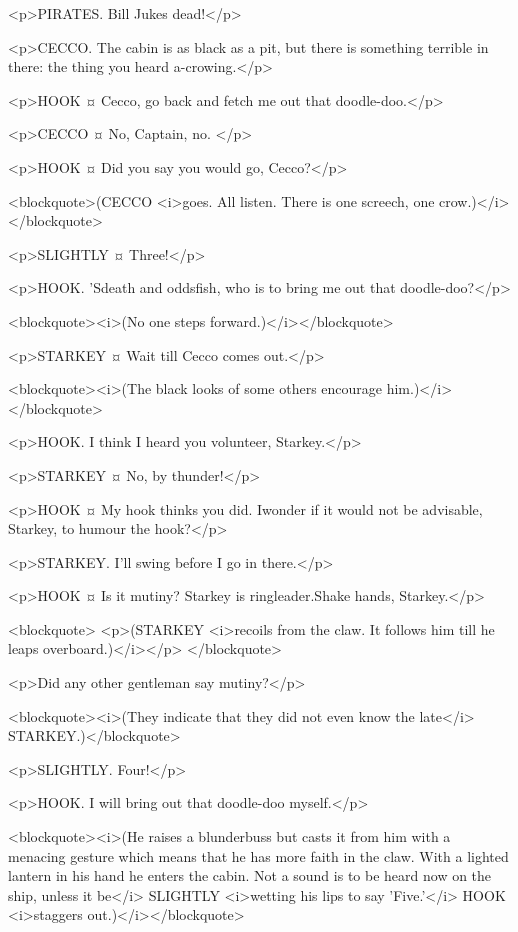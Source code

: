 <p>PIRATES. Bill Jukes dead!</p>

<p>CECCO. The cabin is as black as a pit, but there is something terrible in there: the thing you heard a-crowing.</p>

<p>HOOK ¤
Cecco, go back and fetch me out that doodle-doo.</p>

<p>CECCO ¤
No, Captain, no.
</p>

<p>HOOK ¤
Did you say you would go, Cecco?</p>

<blockquote>(CECCO <i>goes. All listen. There is one screech, one crow.)</i></blockquote>

<p>SLIGHTLY ¤
Three!</p>

<p>HOOK. 'Sdeath and oddsfish, who is to bring me out that doodle-doo?</p>

<blockquote><i>(No one steps forward.)</i></blockquote>

<p>STARKEY ¤
Wait till Cecco comes out.</p>

<blockquote><i>(The black looks of some others encourage him.)</i></blockquote>

<p>HOOK. I think I heard you volunteer, Starkey.</p>

<p>STARKEY ¤
No, by thunder!</p>

<p>HOOK ¤
My hook thinks you did. Iwonder if it would not be advisable, Starkey, to humour the hook?</p>

<p>STARKEY. I'll swing before I go in there.</p>

<p>HOOK ¤
Is it mutiny? Starkey is ringleader.Shake hands, Starkey.</p>

<blockquote> <p>(STARKEY <i>recoils from the claw. It follows him till he leaps overboard.)</i></p> </blockquote>

<p>Did any other gentleman say mutiny?</p>

<blockquote><i>(They indicate that they did not even know the late</i> STARKEY.)</blockquote>

<p>SLIGHTLY. Four!</p>

<p>HOOK. I will bring out that doodle-doo myself.</p>

<blockquote><i>(He raises a blunderbuss but casts it from him with a menacing gesture which means that he has more faith in the claw. With a lighted lantern in his hand he enters the cabin. Not a sound is to be heard now on the ship, unless it be</i> SLIGHTLY <i>wetting his lips to say 'Five.'</i> HOOK <i>staggers out.)</i></blockquote>

